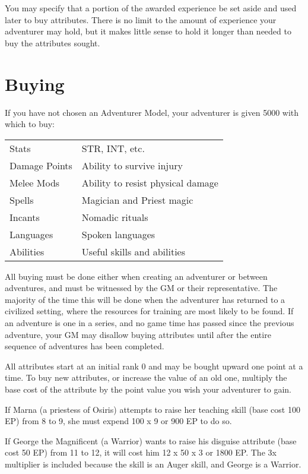 You may specify that a portion of the awarded experience be set aside and used later to buy attributes. There is no limit to the amount of experience your adventurer may hold, but it makes little sense to hold it longer than needed to buy the attributes sought.
\section{Buying}
\label{create-buying}
If you have not chosen an Adventurer Model, your adventurer is given 5000 \EP with which to buy:

\begin{normboxc}
\small
\begin{tabular}{@{}l l}
Stats & STR, INT, etc.\\
Damage Points  & Ability to survive injury\\
Melee Mods & Ability to resist physical damage\\
Spells & Magician and Priest magic\\
Incants & Nomadic rituals\\
Languages & Spoken languages\\
Abilities & Useful skills and abilities\\
\end{tabular}
\end{normboxc}

All buying must be done either when creating an adventurer or between adventures, and must be witnessed by the GM or their representative. The majority of the time this will be done when the adventurer has returned to a civilized setting, where the resources for training are most likely to be found. If an adventure is one in a series, and no game time has passed since the previous adventure, your GM may disallow buying attributes until after the entire sequence of adventures has been completed.

All attributes start at an initial rank 0 and may be bought upward one point at a time. To buy new attributes, or increase the value of an old one, multiply the base cost of the attribute by the point value you wish your adventurer to gain.

If Marna (a priestess of Osiris) attempts to raise her teaching skill (base cost 100 EP) from 8 to 9, she must expend 100 x 9 or 900 EP to do so.

If George the Magnificent (a Warrior) wants to raise his disguise attribute (base cost 50 EP) from 11 to 12, it will cost him 12 x 50 x 3 or 1800 EP. The 3x multiplier is included because the skill is an Auger skill, and George is a Warrior. 

